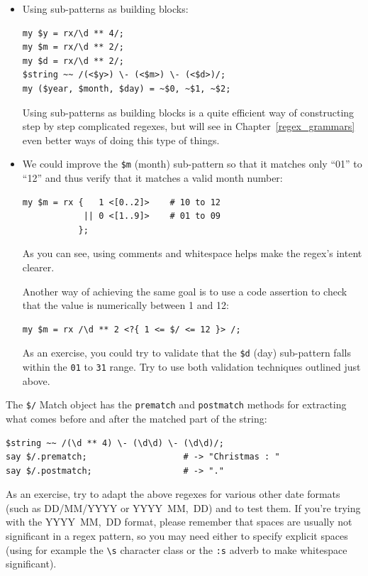 \begin{itemize}
\item Using sub-patterns as building blocks:
\begin{verbatim}
my $y = rx/\d ** 4/;
my $m = rx/\d ** 2/;
my $d = rx/\d ** 2/;
$string ~~ /(<$y>) \- (<$m>) \- (<$d>)/;
my ($year, $month, $day) = ~$0, ~$1, ~$2;
\end{verbatim}
%

Using sub-patterns as building blocks is a quite efficient 
way of constructing step by step complicated regexes, but 
will see in Chapter~\ref{regex_grammars} even better ways 
of doing this type of things.

\item We could improve the \verb'$m' (month) sub-pattern so 
that it matches only ``01'' to ``12'' and thus 
verify that it matches a valid month number:

\begin{verbatim}
my $m = rx {   1 <[0..2]>    # 10 to 12
            || 0 <[1..9]>    # 01 to 09
           };
\end{verbatim}
%

As you can see, using comments and whitespace helps 
make the regex's intent clearer.

Another way of achieving the same goal is to use a 
code assertion to check that the value is numerically 
between 1 and 12:

\begin{verbatim}
my $m = rx /\d ** 2 <?{ 1 <= $/ <= 12 }> /;
\end{verbatim}

As an exercise, you could try to validate that the \verb'$d' 
(day) sub-pattern falls within the \verb'01' to \verb'31' 
range. Try to use both validation techniques outlined just 
above.

\end{itemize}

The \verb'$/' Match object has the {\tt prematch} and 
{\tt postmatch} methods for extracting what comes before 
and after the matched part of the string:

\begin{verbatim}
$string ~~ /(\d ** 4) \- (\d\d) \- (\d\d)/;
say $/.prematch;                   # -> "Christmas : "
say $/.postmatch;                  # -> "."
\end{verbatim}
%

As an exercise, try to adapt the above regexes for various 
other date formats (such as DD/MM/YYYY or 
YYYY~MM,~DD) and to test them. If you're trying with 
the YYYY~MM,~DD format, please remember that spaces are 
usually not significant in a regex pattern, so you may need 
either to specify explicit spaces (using for example the \verb'\s' 
character class or the \verb':s' adverb to make 
whitespace significant). 

